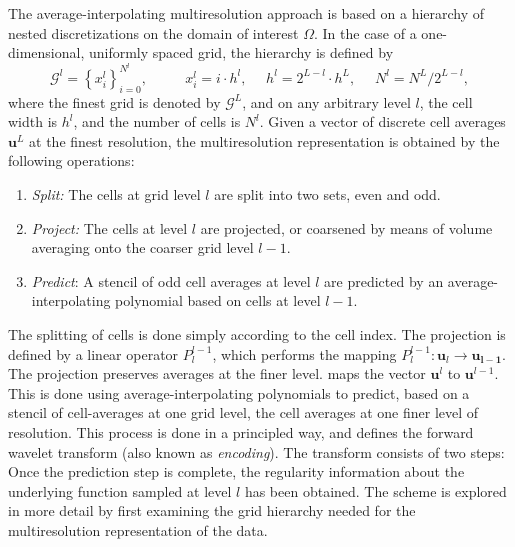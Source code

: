 \documentclass[12pt,letterpaper]{article}
\begin{document}
    The average-interpolating multiresolution approach is based on a hierarchy
    of nested discretizations on the domain of interest $\Omega$. In the case of
    a one-dimensional, uniformly spaced grid, the hierarchy is defined by
    \begin{equation}
        \mathcal{G}^{l} = \left\{ x_{i}^{l} \right\}_{i=0}^{N^{l}}, \text{ }
        \text{ } \text{ } \text{ } x_{i}^{l} = i \cdot h^{l}, \text{ }
        \text{ } h^{l} = 2^{L-l} \cdot h^{L}, \text{ } \text{ } N^{l} = N^{L}
        / 2^{L-l},
    \end{equation}
    where the finest grid is denoted by $\mathcal{G}^{L}$, and on any arbitrary
    level $l$, the cell width is $h^{l}$, and the number of cells is $N^{l}$.
    Given a vector of discrete cell averages $\bm{u}^{L}$ at the finest
    resolution, the multiresolution representation is obtained by the following
    operations:
    \begin{enumerate}
        \item[] \textit{Split:} The cells at grid level $l$ are split into two
            sets, even and odd.
        \item[] \textit{Project:} The cells at level $l$ are projected, or
            coarsened by means of volume averaging onto the coarser grid level
            $l-1$.
        \item[] \textit{Predict}: A stencil of odd cell averages at level $l$ are predicted
                by an average-interpolating polynomial based on cells at level
                $l-1$.
    \end{enumerate}
    The splitting of cells is done simply according to the cell index. The
    projection is defined by a linear operator $P_{l}^{l-1}$, which performs the
    mapping $P_{l}^{l-1} : \bm{u}_{l} \rightarrow \bm{u_{l-1}}$. The projection
    preserves averages at the finer level.  maps the vector $\bm{u}^{l}$ to
    $\bm{u}^{l-1}$. This is done using average-interpolating polynomials to
    predict, based on a stencil of cell-averages at one grid level, the cell
    averages at one finer level of resolution. This process is done in a
    principled way, and defines the forward wavelet transform (also known as
    \textit{encoding}). The transform consists of two steps: Once the prediction
    step is complete, the regularity information about the underlying function
    sampled at level $l$ has been obtained. The scheme is explored in more
    detail by first examining the grid hierarchy needed for the multiresolution
    representation of the data.
\end{document}
